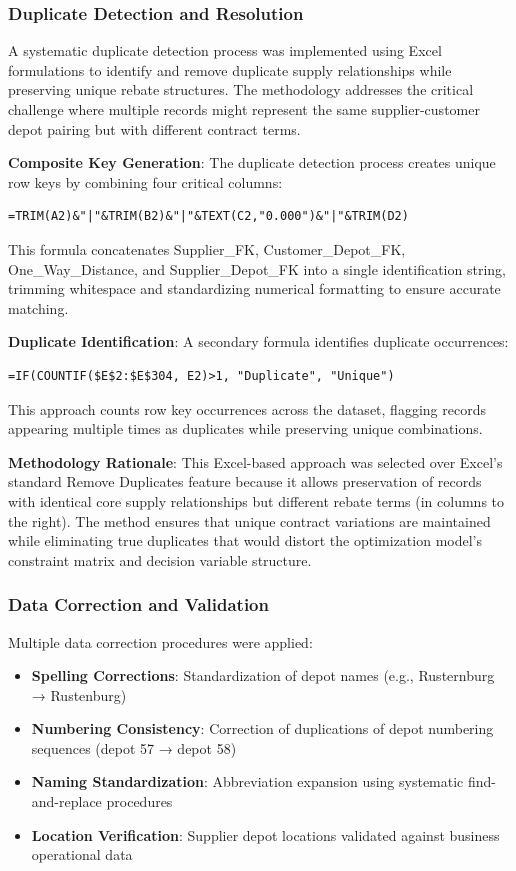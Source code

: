 \subsubsection{Duplicate Detection and Resolution}
A systematic duplicate detection process was implemented using Excel formulations to identify and remove duplicate supply relationships while preserving unique rebate structures. The methodology addresses the critical challenge where multiple records might represent the same supplier-customer depot pairing but with different contract terms.

\textbf{Composite Key Generation}: The duplicate detection process creates unique row keys by combining four critical columns:
\begin{verbatim}
=TRIM(A2)&"|"&TRIM(B2)&"|"&TEXT(C2,"0.000")&"|"&TRIM(D2)
\end{verbatim}
This formula concatenates Supplier\_FK, Customer\_Depot\_FK, One\_Way\_Distance, and Supplier\_Depot\_FK into a single identification string, trimming whitespace and standardizing numerical formatting to ensure accurate matching.

\textbf{Duplicate Identification}: A secondary formula identifies duplicate occurrences:
\begin{verbatim}
=IF(COUNTIF($E$2:$E$304, E2)>1, "Duplicate", "Unique")
\end{verbatim}
This approach counts row key occurrences across the dataset, flagging records appearing multiple times as duplicates while preserving unique combinations.

\textbf{Methodology Rationale}: This Excel-based approach was selected over Excel's standard Remove Duplicates feature because it allows preservation of records with identical core supply relationships but different rebate terms (in columns to the right). The method ensures that unique contract variations are maintained while eliminating true duplicates that would distort the optimization model's constraint matrix and decision variable structure.

\subsubsection{Data Correction and Validation}
Multiple data correction procedures were applied:
\begin{itemize}
    \item \textbf{Spelling Corrections}: Standardization of depot names (e.g., Rusternburg → Rustenburg)
    \item \textbf{Numbering Consistency}: Correction of duplications of depot numbering sequences (depot 57 → depot 58)
    \item \textbf{Naming Standardization}: Abbreviation expansion using systematic find-and-replace procedures
    \item \textbf{Location Verification}: Supplier depot locations validated against business operational data
\end{itemize}

